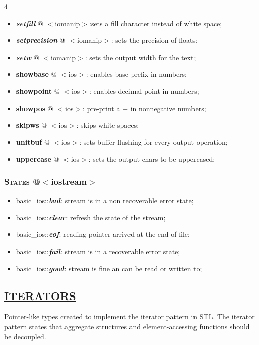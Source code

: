 \documentclass[10pt]{article}
\newcommand{\softseparator}{%
  \par\noindent{\color{RuleGray}\rule{\linewidth}{0.35pt}}\vspace{1pt}
}
\begin{document}
\begin{multicols*}{4}
{\begin{itemize}[leftmargin=*,topsep=0.25pt]
	\item \emph{\textbf{setfill}} @ $<$iomanip$>$:sets a fill character instead of white space; 
	\item \emph{\textbf{setprecision}} @ $<$iomanip$>$: sets the precision of floats; 
	\item \emph{\textbf{setw}} @ $<$iomanip$>$: sets the output width for the text; 
	\item \textbf{showbase} @ $<$ios$>$: enables base prefix in numbers;
	\item \textbf{showpoint} @ $<$ios$>$: enables decimal point in numbers;
	\item \textbf{showpos} @ $<$ios$>$: pre-print a $+$ in nonnegative numbers;
	\item \textbf{skipws} @ $<$ios$>$: skips white spaces;
	\item \textbf{unitbuf} @ $<$ios$>$: sets buffer flushing for every output operation;
	\item \textbf{uppercase} @ $<$ios$>$: sets the output chars to be uppercased;
\end{itemize}


\subsubsection*{\textsc{States}  @$<$iostream$>$} 
\begin{itemize}[leftmargin=*,topsep=0.25pt]
  \setlength\itemsep{-1.8pt}
	\item basic\_ios::\emph{\textbf{bad}}: stream is in a non recoverable error state;
	\item basic\_ios::\emph{\textbf{clear}}: refresh the state of the stream;
	\item basic\_ios::\emph{\textbf{eof}}: reading pointer arrived at the end of file;
	\item basic\_ios::\emph{\textbf{fail}}: stream is in a recoverable error state;
	\item basic\_ios::\emph{\textbf{good}}: stream is fine an can be read or written to;
\end{itemize}

}

\softseparator

{\color{Blue}
\subsection*{\href{https://en.cppreference.com/w/cpp/iterator}{\underline{ITERATORS}}}	
\noindent
Pointer-like types created to implement the iterator pattern in STL. The iterator pattern states that aggregate structures and element-accessing functions should be decoupled.

}
\end{multicols*}
\end{document}
